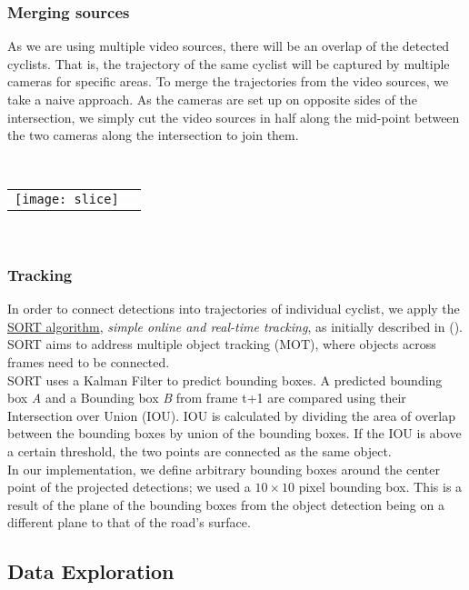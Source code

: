 \subsubsection{Merging sources}
As we are using multiple video sources, there will be an overlap of the detected cyclists. 
That is, the trajectory of the same cyclist will be captured by multiple cameras for specific areas. 
To merge the trajectories from the video sources, we take a naive approach. As the cameras are set up on
opposite sides of the intersection, we simply cut the video sources in half along the mid-point between
the two cameras along the intersection to join them.

\ \\ 
\noindent
\begin{tabular}{@{}cc}
\texttt{[image: slice]} 
\end{tabular}
\label{slice}
\

\subsubsection{Tracking}

In order to connect detections into trajectories of individual cyclist, we apply 
the \href{https://github.com/abewley/sort}{SORT algorithm}, \textit{simple online and real-time tracking}, as initially described in (\cite{Bewley2016_sort}). 
SORT aims to address multiple object tracking (MOT), where objects across frames need to be connected. 
\ \\ 

SORT uses a Kalman Filter to predict bounding boxes. A predicted bounding box \textit{A} and a Bounding box \textit{B} from 
frame t+1 are compared using their Intersection over Union (IOU). IOU is calculated by dividing the area of overlap between the 
bounding boxes by union of the bounding boxes. If the IOU is above a certain threshold, the two points are connected as the same object.
\ \\ 

In our implementation, we define arbitrary bounding boxes around the center point of the projected detections; 
we used a $10 \times 10$ pixel bounding box. This is a result of the plane of the bounding boxes from the object detection being on
a different plane to that of the road's surface.

\subsection{Data Exploration}

